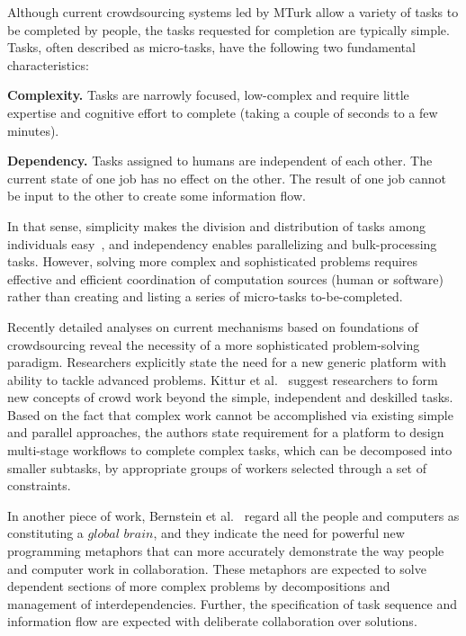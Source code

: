Although current crowdsourcing systems led by MTurk allow a variety of tasks 
to be completed by people, the tasks requested for completion are typically simple. 
Tasks, often described as micro-tasks, have the following two fundamental characteristics:

\textbf{Complexity.} Tasks are narrowly focused, low-complex and require 
little expertise and cognitive effort to complete (taking a couple of seconds to 
a few minutes).

\textbf{Dependency.} Tasks assigned to humans are independent of each other. 
The current state of one job has no effect on the other. The result of one job cannot 
be input to the other to create some information flow.

In that sense, simplicity makes the division and distribution of tasks among 
individuals easy~\cite{Zhang2011}, and independency enables parallelizing 
and bulk-processing tasks. However, solving more complex and sophisticated 
problems requires effective and efficient coordination of computation sources 
(human or software) rather than creating and listing a series of micro-tasks 
to-be-completed.

Recently detailed analyses on current mechanisms based on foundations of 
crowdsourcing reveal the necessity of a more sophisticated problem-solving 
paradigm. Researchers explicitly state the need for a new generic platform 
with ability to tackle advanced problems. Kittur et al.~\cite{Kittur2013} 
suggest researchers to form new concepts of crowd work beyond 
the simple, independent and deskilled tasks. Based on the fact that complex 
work cannot be accomplished via existing simple and parallel approaches,
the authors state requirement for a platform to design multi-stage workflows 
to complete complex tasks, which can be decomposed into smaller subtasks, 
by appropriate groups of workers selected through a set of constraints.

In another piece of work, Bernstein et al.~\cite{Bernstein2012} regard all the 
people and computers as constituting a $global$ $brain$, and they indicate the 
need for powerful new programming metaphors that can more accurately 
demonstrate the way people and computer work in collaboration. These 
metaphors are expected to solve dependent sections of more complex problems by 
decompositions and management of interdependencies. Further, the specification 
of task sequence and information flow are expected with deliberate collaboration 
over solutions.

